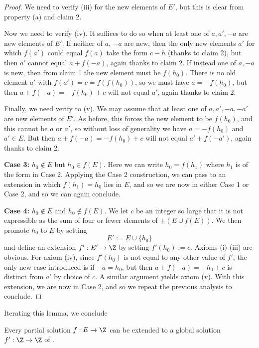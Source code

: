 \begin{proof}
We need to verify (iii) for the new elements of $E'$, but this is clear from property (a) and claim 2.

Now we need to verify (iv).  It suffices to do so when at least one of $a,a',-a$ are new elements of $E'$.  If neither of $a$, $-a$ are new, then the only new elements $a'$ for which $f(a')$ could equal $f(a)$ take the form $c-h$ (thanks to claim 2), but then $a'$ cannot equal $a+f(-a)$, again thanks to claim 2.  If instead one of $a, -a$ is new, then from claim 1 the new element must be $f(h_0)$.  There is no old element $a'$ with $f(a') = c = f(f(h_0))$, so we must have $a = -f(h_0)$, but then $a + f(-a) = -f(h_0)+c$ will not equal $a'$, again thanks to claim 2.

Finally, we need verify to (v).  We may assume that at least one of $a,a',-a,-a'$ are new elements of $E'$.  As before, this forces the new element to be $f(h_0)$, and this cannot be $a$ or $a'$, so without loss of generality we have $a = -f(h_0)$ and $a' \in E$.  But then $a + f(-a) = -f(h_0)+c$ will not equal $a' + f(-a')$, again thanks to claim 2.

{\bf Case 3:} $h_0 \not \in E$ but $h_0 \in f(E)$.  Here we can write $h_0 = f(h_1)$ where $h_1$ is of the form in Case 2.  Applying the Case 2 construction, we can pass to an extension in which $f(h_1) = h_0$ lies in $E$, and so we are now in either Case 1 or Case 2, and so we can again conclude.

{\bf Case 4:} $h_0 \not \in E$ and $h_0 \not \in f(E)$.  We let $c$ be an integer so large that it is not expressible as the sum of four or fewer elements of $\pm (E \cup f(E))$.  We then promote $h_0$ to $E$ by setting
$$E' := E \cup \{h_0\}$$
and define an extension $f': E' \to \Z$ by setting $f'(h_0) := c$.  Axioms (i)-(iii) are obvious.  For axiom (iv), since $f'(h_0)$ is not equal to any other value of $f'$, the only new case introduced is if $-a = h_0$, but then $a+f(-a) = -h_0+c$ is distinct from $a'$ by choice of $c$.  A similar argument yields axiom (v).  With this extension, we are now in Case 2, and so we repeat the previous analysis to conclude.
\end{proof}

Iterating this lemma, we conclude

\begin{corollary}\label{dupont-iter}\leanok{} Every partial solution $f: E \to \Z$ can be extended to a global solution $f': \Z \to\Z$ of .
\end{corollary}

